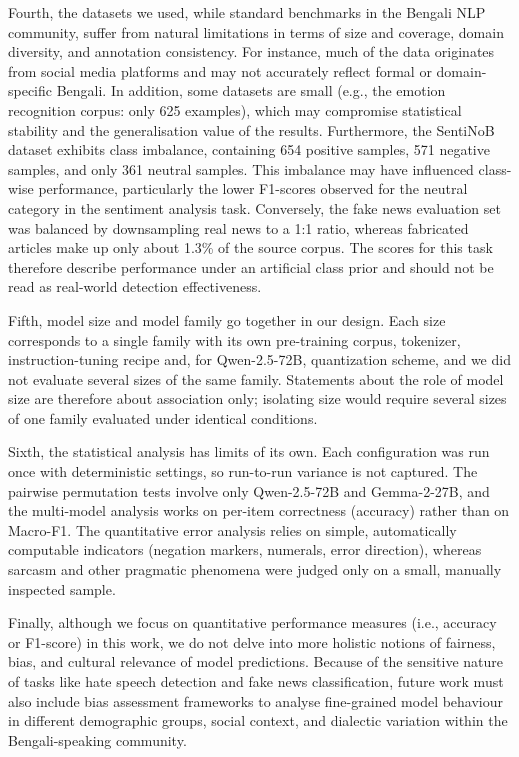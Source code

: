 \documentclass[10pt,letterpaper]{article}
\begin{document}
Fourth, the datasets we used, while standard benchmarks in the Bengali NLP community, suffer from natural limitations in terms of size and coverage, domain diversity, and annotation consistency. For instance, much of the data originates from social media platforms and may not accurately reflect formal or domain-specific Bengali. In addition, some datasets are small (e.g., the emotion recognition corpus: only 625 examples), which may compromise statistical stability and the generalisation value of the results. Furthermore, the SentiNoB dataset exhibits class imbalance, containing 654 positive samples, 571 negative samples, and only 361 neutral samples. This imbalance may have influenced class-wise performance, particularly the lower F1-scores observed for the neutral category in the sentiment analysis task. Conversely, the fake news evaluation set was balanced by downsampling real news to a 1:1 ratio, whereas fabricated articles make up only about 1.3\% of the source corpus. The scores for this task therefore describe performance under an artificial class prior and should not be read as real-world detection effectiveness.

Fifth, model size and model family go together in our design. Each size corresponds to a single family with its own pre-training corpus, tokenizer, instruction-tuning recipe and, for Qwen-2.5-72B, quantization scheme, and we did not evaluate several sizes of the same family. Statements about the role of model size are therefore about association only; isolating size would require several sizes of one family evaluated under identical conditions.

Sixth, the statistical analysis has limits of its own. Each configuration was run once with deterministic settings, so run-to-run variance is not captured. The pairwise permutation tests involve only Qwen-2.5-72B and Gemma-2-27B, and the multi-model analysis works on per-item correctness (accuracy) rather than on Macro-F1. The quantitative error analysis relies on simple, automatically computable indicators (negation markers, numerals, error direction), whereas sarcasm and other pragmatic phenomena were judged only on a small, manually inspected sample.


Finally, although we focus on quantitative performance measures (i.e., accuracy or F1-score) in this work, we do not delve into more holistic notions of fairness, bias, and cultural relevance of model predictions. Because of the sensitive nature of tasks like hate speech detection and fake news classification, future work must also include bias assessment frameworks to analyse fine-grained model behaviour in different demographic groups, social context, and dialectic variation within the Bengali-speaking community.
\end{document}
